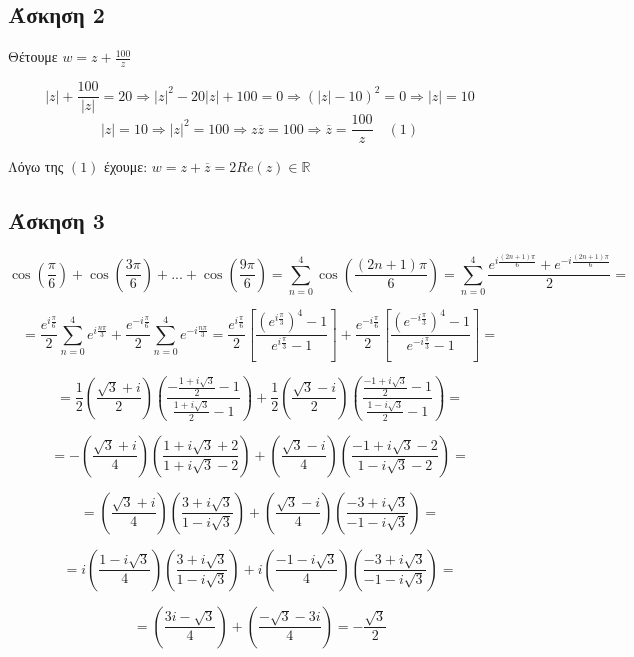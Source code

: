\documentclass[12pt]{article}
\begin{document}
 \subsection{Άσκηση 2}
Θέτουμε $ w=z+\frac{100}{z}$

$$ |z|+\frac{100}{|z|}=20 \Rightarrow |z|^2 -20|z|+100=0 \Rightarrow (|z|-10)^2=0\Rightarrow |z|=10$$
$$|z|=10 \Rightarrow |z|^2=100 \Rightarrow z\overline{z}=100 \Rightarrow \overline{z}=\frac{100}{z} \quad (1)$$

Λόγω της $(1)$ έχουμε: $w=z+\overline{z}=2Re(z)\in\mathbb{R}$

\newpage

 \subsection{Άσκηση 3}

$$ \cos\left(\frac{\pi}{6}\right)+\cos\left(\frac{3\pi}{6}\right)+...+\cos\left(\frac{9\pi}{6}\right)= 
\sum_{n=0}^{4} \cos\left(\frac{(2n+1)\pi}{6}\right)=\sum_{n=0}^{4} \frac{e^{i\frac{(2n+1)\pi}{6}}+e^{-i\frac{(2n+1)\pi}{6}}}{2}=$$

$$ =\frac{e^ {i \frac{\pi}{6} }}{2}\sum_{n=0}^{4} { e^ {i \frac{n\pi}{3} } } + \frac{e^ {-i \frac{\pi}{6} }}{2}\sum_{n=0}^{4} { e^ {-i \frac{n\pi}{3} }} 
=\frac{e^ {i \frac{\pi}{6} }}{2} \left[ \frac{ { \left( e^ {i \frac{\pi}{3} }\right) }^4-1}{ { e^ {i \frac{\pi}{3} } -1}} \right] + \frac{e^ {-i \frac{\pi}{6} }}{2} \left[ \frac{ { \left( e^ {-i \frac{\pi}{3} }\right) }^4-1}{ { e^ {-i \frac{\pi}{3} } -1}} \right]= $$

$$=\frac{1}{2} \left( \frac{\sqrt{3}+i}{2} \right) \left( \frac{-\frac{1+i\sqrt{3}}{2}-1}{\frac{1+i\sqrt{3}}{2}-1} \right) + \frac{1}{2} \left( \frac{\sqrt{3}-i}{2} \right) \left( \frac{\frac{-1+i\sqrt{3}}{2}-1}{\frac{1-i\sqrt{3}}{2}-1} \right)=  $$

$$= -\left( \frac{\sqrt{3}+i}{4} \right)\left( \frac{1+i\sqrt{3}+2}{1+i\sqrt{3}-2} \right) +
\left( \frac{\sqrt{3}-i}{4} \right)\left( \frac{-1+i\sqrt{3}-2}{1-i\sqrt{3}-2} \right)= $$

$$ = \left( \frac{\sqrt{3}+i}{4} \right)\left( \frac{3+i\sqrt{3}}{1-i\sqrt{3}} \right) +
\left( \frac{\sqrt{3}-i}{4} \right)\left( \frac{-3+i\sqrt{3}}{-1-i\sqrt{3}} \right)= $$

$$ = i\left( \frac{1-i\sqrt{3}}{4} \right)\left( \frac{3+i\sqrt{3}}{1-i\sqrt{3}} \right) + i
\left( \frac{-1-i\sqrt{3}}{4} \right)\left( \frac{-3+i\sqrt{3}}{-1-i\sqrt{3}} \right)= $$

$$ = \left( \frac{3i-\sqrt{3}}{4} \right) + 
\left( \frac{-\sqrt{3}-3i}{4} \right) = -\frac{\sqrt{3}}{2} $$
\newpage
\end{document}

